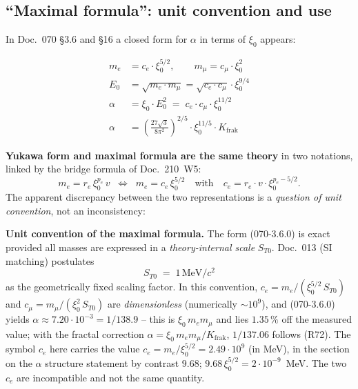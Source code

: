 \subsection{\enquote{Maximal formula}: unit convention and use}
\label{subsec:warning-maximal-formula}

In Doc.~070 §3.6 and §16 a closed form for $\alpha$ in terms of $\xi_0$
appears:

\begin{align}
  m_e &= c_e \cdot \xi_0^{5/2}, \qquad m_\mu = c_\mu \cdot \xi_0^{2}
  \tag*{(070-4.2)}\\
  E_0 &= \sqrt{m_e \cdot m_\mu} = \sqrt{c_e \cdot c_\mu}\cdot \xi_0^{9/4}
  \tag*{(070-3)}\\
  \alpha &= \xi_0 \cdot E_0^2 \;=\; c_e \cdot c_\mu \cdot \xi_0^{11/2}
  \tag*{(070-3.6.0)}\\
  \alpha &= \left(\frac{27\sqrt{3}}{8\pi^2}\right)^{2/5}
           \cdot \xi_0^{11/5} \cdot K_{\text{frak}}
  \tag*{(070-3.6.1)}
\end{align}

\textbf{Yukawa form and maximal formula are the same theory} in two
notations, linked by the bridge formula of Doc.~210~W5:
\[
  m_e = r_e\,\xi_0^{p_e}\,v
  \;\;\Longleftrightarrow\;\;
  m_e = c_e\,\xi_0^{5/2}
  \quad\text{with}\quad
  c_e = r_e \cdot v \cdot \xi_0^{p_e - 5/2}.
\]
The apparent discrepancy between the two representations is a
\emph{question of unit convention}, not an inconsistency:

\textbf{Unit convention of the maximal formula.}
The form (070-3.6.0) is exact provided all masses are expressed in a
\emph{theory-internal scale} $S_{T0}$. Doc.~013 (SI matching) postulates
\begin{equation}
  S_{T0} \;=\; 1\,\text{MeV}/c^2
\end{equation}
as the geometrically fixed scaling factor. In this convention,
$c_e = m_e/(\xi_0^{5/2}\,S_{T0})$ and $c_\mu = m_\mu/(\xi_0^{2}\,S_{T0})$
are \emph{dimensionless} (numerically $\sim 10^9$), and (070-3.6.0)
yields $\alpha \approx 7.20\cdot 10^{-3} = 1/138.9$ -- this is $\xi_0\,m_e m_\mu$ and lies $1.35\,\%$ off the measured value; with the fractal correction $\alpha = \xi_0\,m_e m_\mu/K_{\text{frak}}$, $1/137.06$ follows (R72). The symbol $c_e$ here carries the value $c_e = m_e/\xi_0^{5/2} = 2.49 \cdot 10^{9}$ (in MeV), in the section on the $\alpha$ structure statement by contrast $9.68$; $9.68\,\xi_0^{5/2} = 2 \cdot 10^{-9}$~MeV. The two $c_e$ are incompatible and not the same quantity.

